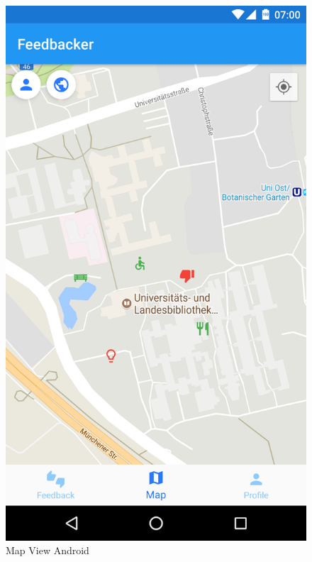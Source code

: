 \begin{figure}[H]
  \includegraphics[width=\linewidth]{bilder/Screenshot_Map.png}
  \caption{Map View Android}\label{fig_map}
\endminipage\hfill
{}%

\end{figure}
